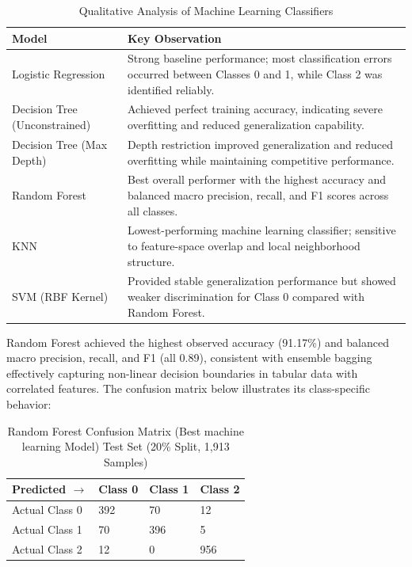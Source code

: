 \documentclass[preprint,11pt,times]{elsarticle}
\begin{document}
\FloatBarrier
\begin{table}[htbp]
\centering
\caption{Qualitative Analysis of Machine Learning Classifiers}
\label{tab:ml_observations}

\begin{tabular}{p{4cm} p{9cm}}
\toprule
Model & Key Observation \\
\midrule

Logistic Regression &
Strong baseline performance; most classification errors occurred between Classes 0 and 1, while Class 2 was identified reliably. \\

Decision Tree (Unconstrained) &
Achieved perfect training accuracy, indicating severe overfitting and reduced generalization capability. \\

Decision Tree (Max Depth) &
Depth restriction improved generalization and reduced overfitting while maintaining competitive performance. \\

Random Forest &
Best overall performer with the highest accuracy and balanced macro precision, recall, and F1 scores across all classes. \\

KNN &
Lowest-performing machine learning classifier; sensitive to feature-space overlap and local neighborhood structure. \\

SVM (RBF Kernel) &
Provided stable generalization performance but showed weaker discrimination for Class 0 compared with Random Forest. \\

\bottomrule
\end{tabular}
\end{table}

Random Forest achieved the highest observed accuracy (91.17\%) and balanced macro precision, recall, and F1 (all 0.89), consistent with ensemble bagging effectively capturing non-linear decision boundaries in tabular data with correlated features. The confusion matrix below illustrates its class-specific behavior:
\begin{table}[!ht]
\caption{Random Forest Confusion Matrix (Best machine learning Model) Test Set (20\% Split, 1,913 Samples)}\label{tab4}%
\begin{tabular}{@{}llll@{}}
\toprule
Predicted $\rightarrow$ & Class 0 & Class 1 & Class 2 \\
\midrule
Actual Class 0 & 392 & 70 & 12 \\
Actual Class 1 & 70 & 396 & 5 \\
Actual Class 2 & 12 & 0 & 956 \\
\bottomrule
\end{tabular}
\end{table}
\end{document}
